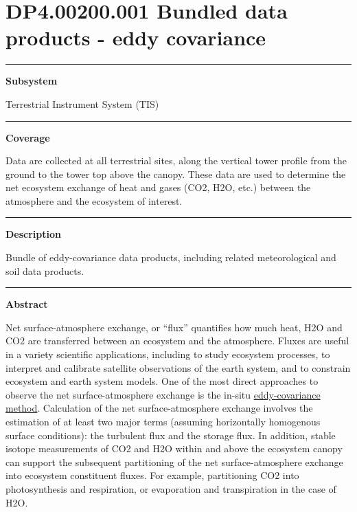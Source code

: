 \documentclass[]{article}
\begin{document}
\section{DP4.00200.001 Bundled data products - eddy
covariance}\label{dp4.00200.001-bundled-data-products---eddy-covariance}

\begin{center}\rule{0.5\linewidth}{\linethickness}\end{center}

\textbf{Subsystem}

Terrestrial Instrument System (TIS)

\begin{center}\rule{0.5\linewidth}{\linethickness}\end{center}

\textbf{Coverage}

Data are collected at all terrestrial sites, along the vertical tower
profile from the ground to the tower top above the canopy. These data
are used to determine the net ecosystem exchange of heat and gases (CO2,
H2O, etc.) between the atmosphere and the ecosystem of interest.

\begin{center}\rule{0.5\linewidth}{\linethickness}\end{center}

\textbf{Description}

Bundle of eddy-covariance data products, including related
meteorological and soil data products.

\begin{center}\rule{0.5\linewidth}{\linethickness}\end{center}

\textbf{Abstract}

Net surface-atmosphere exchange, or ``flux'' quantifies how much heat,
H2O and CO2 are transferred between an ecosystem and the atmosphere.
Fluxes are useful in a variety scientific applications, including to
study ecosystem processes, to interpret and calibrate satellite
observations of the earth system, and to constrain ecosystem and earth
system models. One of the most direct approaches to observe the net
surface-atmosphere exchange is the in-situ
\href{https://youtu.be/CR4Anc8Mkas}{eddy-covariance method}. Calculation
of the net surface-atmosphere exchange involves the estimation of at
least two major terms (assuming horizontally homogenous surface
conditions): the turbulent flux and the storage flux. In addition,
stable isotope measurements of CO2 and H2O within and above the
ecosystem canopy can support the subsequent partitioning of the net
surface-atmosphere exchange into ecosystem constituent fluxes. For
example, partitioning CO2 into photosynthesis and respiration, or
evaporation and transpiration in the case of H2O.
\end{document}

